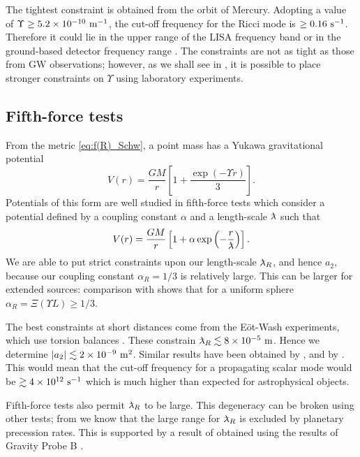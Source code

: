 The tightest constraint is obtained from the orbit of Mercury. Adopting a value of $\Upsilon \geq 5.2 \times 10^{-10}~\mathrm{m^{-1}}$, the cut-off frequency for the Ricci mode is $\geq 0.16~\mathrm{s^{-1}}$. Therefore it could lie in the upper range of the LISA frequency band \citep{Bender1998,Danzmann2003} or in the ground-based detector frequency range \citep{Abramovici1992, Abbott2009, Accadia2010}. The constraints are not as tight as those from GW observations; however, as we shall see in , it is possible to place stronger constraints on $\Upsilon$ using laboratory experiments.

\subsection{Fifth-force tests}\label{sec:Fifth}

From the metric \eqref{eq:f(R)_Schw}, a point mass has a Yukawa gravitational potential \citep{Stelle1978, Capozziello2009a, Naf2010}
\begin{equation}
V(r) = \frac{GM}{r}\left[1 + \frac{\exp(- \Upsilon r)}{3}\right].
\end{equation}
Potentials of this form are well studied in fifth-force tests \citep{Will2006, Adelberger2009, Adelberger2003} which consider a potential defined by a coupling constant $\alpha$ and a length-scale $\lambdabar$ such that
\begin{equation}
V(r) = \frac{GM}{r}\left[1 + \alpha\exp\left(-\frac{r}{\lambdabar}\right)\right].
\end{equation}
We are able to put strict constraints upon our length-scale $\lambdabar_R$, and hence $a_2$, because our coupling constant $\alpha_R = 1/3$ is relatively large. This can be larger for extended sources: comparison with  shows that for a uniform sphere $\alpha_R = \Xi(\Upsilon L) \geq 1/3$.

The best constraints at short distances come from the E\"{o}t-Wash experiments, which use torsion balances \citep{Kapner2007a, Hoyle2004}. These constrain $\lambdabar_R \lesssim 8\times 10^{-5}\units{m}$. Hence we determine $|a_2| \lesssim 2 \times 10^{-9}~\mathrm{m^2}$. Similar results have been obtained by \citet{Cembranos2009}, and by \citet{Naf2010}. This would mean that the cut-off frequency for a propagating scalar mode would be $\gtrsim 4 \times 10^{12}~\mathrm{s^{-1}}$ which is much higher than expected for astrophysical objects.

Fifth-force tests also permit $\lambdabar_R$ to be large. This degeneracy can be broken using other tests; from  we know that the large range for $\lambdabar_R$ is excluded by planetary precession rates. This is supported by a result of \citet{Naf2010} obtained using the results of Gravity Probe B \citep{Everitt2009,Everitt2011}.

